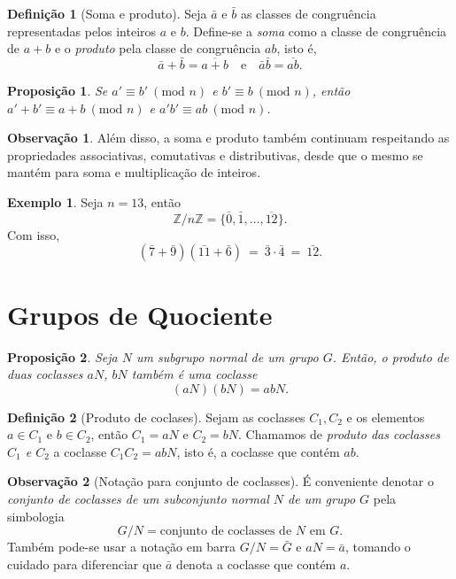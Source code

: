 \documentclass[a4paper,12pt]{report}
\theoremstyle{plain}
\newtheorem{proposicao}{Proposição}[section]
\theoremstyle{definition}
\newtheorem{definicao}{Definição}[section]
\newtheorem{observacao}{Observação}[section]
\newtheorem{exemplo}{Exemplo}[section]
\begin{document}
\begin{definicao}[Soma e produto]
	Seja \(\bar a\) e \(\bar b\) as classes de congruência representadas pelos inteiros \(a\) e \(b\). Define-se a \emph{soma} como a classe de congruência de \(a+b\) e o \emph{produto} pela classe de congruência \(ab\), isto é, \[\bar a + \bar b = \overline{a+b} \quad \text{e}\quad \bar a\bar b = \overline{ab}.\]	
\end{definicao}

\begin{proposicao}
	Se \(a' \equiv b'\ (\text{mod }n)\) e \(b'\equiv b\ (\text{mod }n)\), então
	\(a' + b' \equiv a+b\ (\text{mod }n)\) e
	\(a'b' \equiv ab \ (\text{mod }n)\).
\end{proposicao}

\begin{observacao}
	Além disso, a soma e produto também continuam respeitando as
	propriedades associativas, comutativas e distributivas, desde que o
	mesmo se mantém para soma e multiplicação de inteiros.
\end{observacao}

\begin{exemplo}
	Seja \(n = 13\), então
	\[\mathbb{Z}/n\mathbb{Z} =  \{\bar{0}, \bar{1},\dots,\overline{12}\}.\]
	Com isso,
	\[(\bar 7 + \bar 9)(\bar{11} + \bar 6) \ = \ \bar 3 \cdot \bar 4 \ = \ \bar{12}.\]
\end{exemplo}

\section{Grupos de Quociente}

\begin{proposicao}
	Seja \(N\) um subgrupo normal de um grupo \(G\).
	Então, o produto de duas coclasses \(aN\), \(bN\) também é uma coclasse
	\[(aN) (bN) = abN.\]
\end{proposicao}

\begin{definicao}[Produto de coclases]
	Sejam as coclasses \(C_1, C_2\) e os elementos
	\(a\in C_1\) e \(b\in C_2\), então \(C_1 = aN\) e \(C_2 = bN\). Chamamos
	de \emph{produto das coclasses \(C_1\) e \(C_2\)} a coclasse
	\(C_1C_2 = abN\), isto é, a coclasse que contém \(ab\).	
\end{definicao}

\begin{observacao}[Notação para conjunto de coclasses]
	É conveniente denotar o \emph{conjunto de coclasses de um subconjunto normal \(N\) de um grupo \(G\)} pela simbologia \[G/N = \text{conjunto de coclasses de }N\text{ em }G.\] Também pode-se	usar a notação em barra \(G/N = \bar G\) e \(aN = \bar a\), tomando o
	cuidado para diferenciar que \(\bar a\) denota a coclasse que contém
	\(a\).	
\end{observacao}
\end{document}
